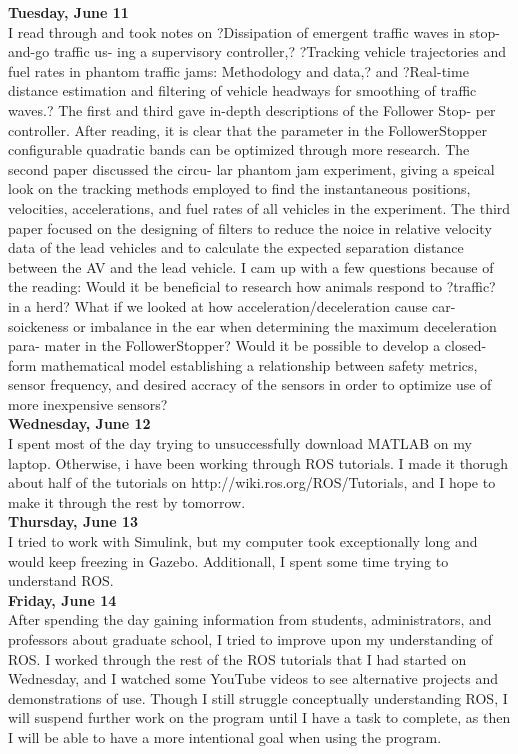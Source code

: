 \documentclass[12pt, letterpaper]{article}
\begin{document}
{\bf Tuesday, June 11}\\
I read through and took notes on ?Dissipation of emergent traffic waves in stop-and-go traffic us- ing a supervisory controller,? ?Tracking vehicle trajectories and fuel rates in phantom traffic jams: Methodology and data,? and ?Real-time distance estimation and filtering of vehicle headways for smoothing of traffic waves.? The first and third gave in-depth descriptions of the Follower Stop- per controller. After reading, it is clear that the parameter in the FollowerStopper configurable quadratic bands can be optimized through more research. The second paper discussed the circu- lar phantom jam experiment, giving a speical look on the tracking methods employed to find the instantaneous positions, velocities, accelerations, and fuel rates of all vehicles in the experiment. The third paper focused on the designing of filters to reduce the noice in relative velocity data of the lead vehicles and to calculate the expected separation distance between the AV and the lead vehicle. I cam up with a few questions because of the reading: Would it be beneficial to research how animals respond to ?traffic? in a herd? What if we looked at how acceleration/deceleration cause car-soickeness or imbalance in the ear when determining the maximum deceleration para- mater in the FollowerStopper? Would it be possible to develop a closed-form mathematical model establishing a relationship between safety metrics, sensor frequency, and desired accracy of the sensors in order to optimize use of more inexpensive sensors? \\
 
{\bf Wednesday, June 12}\\
I spent most of the day trying to unsuccessfully download MATLAB on my laptop. Otherwise, i have been working through ROS tutorials. I made it thorugh about half of the tutorials on http://wiki.ros.org/ROS/Tutorials, and I hope to make it through the rest by tomorrow.\\

{\bf Thursday, June 13}\\
I tried to work with Simulink, but my computer took exceptionally long and would keep freezing in Gazebo. Additionall, I spent some time trying to understand ROS. \\

{\bf Friday, June 14} \\
After spending the day gaining information from students, administrators, and professors about graduate school, I tried to improve upon my understanding of ROS. I worked through the rest of the ROS tutorials that I had started on Wednesday, and I watched some YouTube videos to see alternative projects and demonstrations of use. Though I still struggle conceptually understanding ROS, I will suspend further work on the program until I have a task to complete, as then I will be able to have a more intentional goal when using the program. \\
\end{document}
